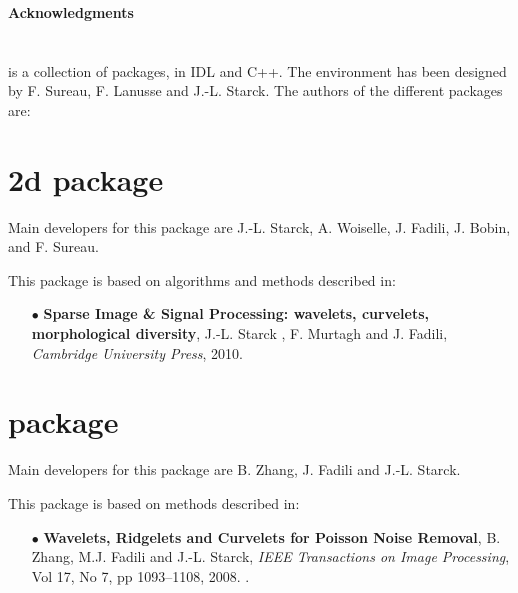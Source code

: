 
\newpage
\thispagestyle{empty}
$ $
\newpage

{\Huge \bf Acknowledgments}
\label{forewd}\\
\vspace{1cm}


\section*{{\isap} }
{\isap} is a collection of packages, in IDL and C++.  The {\isap} environment has been designed by F. Sureau, F. Lanusse and 
J.-L. Starck. The authors of the different packages are:


\section*{\projsparse2d package}
Main developers for this package are  J.-L. Starck, A. Woiselle, J. Fadili, J. Bobin, and F. Sureau. 

This package is based on algorithms and methods described in: 
\begin{itemize}
\item[$\bullet$] {\textbf{Sparse Image \& Signal Processing: wavelets, curvelets, morphological diversity}, J.-L. Starck , F. Murtagh and J. Fadili, \textit{Cambridge University Press},  2010.}
\end{itemize}

\section*{\projmsvst package}
Main developers for this package are  B. Zhang, J. Fadili and J.-L. Starck. 

This package is based on methods described in: 
\begin{itemize}
\item[$\bullet$]  {\textbf{Wavelets, Ridgelets and Curvelets for Poisson Noise Removal}, B. Zhang, M.J. Fadili and J.-L. Starck,  
\textit{IEEE Transactions on Image Processing}, Vol 17, No 7, pp 1093--1108, 2008. }.
\end{itemize}


